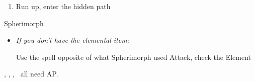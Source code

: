 \begin{enumerate}[resume]
    \item Run up, enter the hidden path
\end{enumerate}
\begin{battle}[12000]{Spherimorph}
    \begin{itemize}
        \tidusf Defend
        \switch{\tidus}{\yuna}
        \yunaf Defend
        \kimahrif Defend
        \switch{\auron}{\rikku}
        \rikkuf Grenade, check the Element
        \yunaf Defend
        \rikkuf \od, HP Sphere with
        \begin{itemize}
            \item Fire: Arctic Wind
            \item Ice: Bomb Core
            \item Water: Lightning Marble
            \item Thunder: Fish Scale
        \end{itemize}
        \item \textit{If you don't have the elemental item:}
        \begin{itemize}
            \switch{\rikku}{\lulu}
            \luluf Use the spell opposite of what Spherimorph used
            \kimahrif Attack, check the Element
            \switch{\yuna}{\rikku}
            \rikkuf \od
        \end{itemize}
    \end{itemize}
    \tidus, \yuna, \kimahri, \rikku\ all need AP.
\end{battle}
